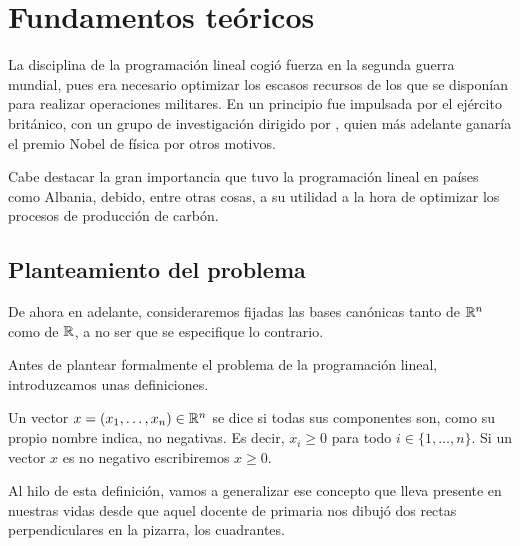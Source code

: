 \chapter{Fundamentos teóricos}
\label{fund}
La disciplina de la programación lineal cogió fuerza en la segunda guerra mundial, pues era necesario optimizar los escasos recursos de los que se disponían para realizar operaciones militares. En un principio fue impulsada por el ejército británico, con un grupo de investigación dirigido por , quien más adelante ganaría el premio Nobel de física por otros motivos.

Cabe destacar la gran importancia que tuvo la programación lineal en países como Albania, debido, entre otras cosas, a su utilidad a la hora de optimizar los procesos de producción de carbón. 
\section{Planteamiento del problema}
De ahora en adelante, consideraremos fijadas las bases canónicas tanto de $\mathbb{R}^n$ como de $\mathbb{R}$, a no ser que se especifique lo contrario.

Antes de plantear formalmente el problema de la programación lineal, introduzcamos unas definiciones.

\begin{defi}
	Un vector $x=(x_1,\dots,x_n)\in\mathbb{R}^n$ se dice  si todas sus componentes son, como su propio nombre indica, no negativas. Es decir, $x_i\geq 0$ para todo $i\in\{1,\dots,n\}$. Si un vector $x$ es no negativo escribiremos $x\geq 0$.
\end{defi}
Al hilo de esta definición, vamos a generalizar ese concepto que lleva presente en nuestras vidas desde que aquel docente de primaria nos dibujó dos rectas perpendiculares en la pizarra, los cuadrantes.

